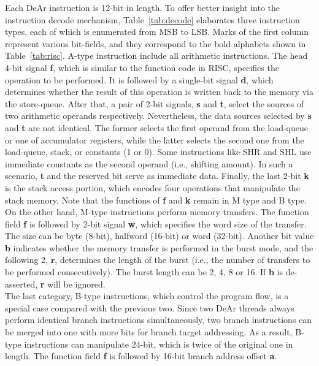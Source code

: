 Each DeAr instruction is 12-bit in length.
To offer better insight into the instruction decode mechanism, 
Table~\ref{tab:decode} elaborates three instruction types, 
each of which is enumerated from MSB to LSB.
Marks of the first column represent various bit-fields, 
and they correspond to the bold alphabets shown in Table~\ref{tab:risc}.
A-type instruction include all arithmetic instructions.
The head 4-bit signal \textbf{f}, which is similar to the function code in RISC, specifies the operation to be performed.
It is followed by a single-bit signal \textbf{d}, which determines whether the result of this operation is written back to the memory via the store-queue.
After that, a pair of 2-bit signals, \textbf{s} and \textbf{t}, select the sources of two arithmetic operands respectively. 
Nevertheless, the data sources selected by \textbf{s} and \textbf{t} are not identical.
The former selects the first operand from the load-queue or one of accumulator registers, 
while the latter selects the second one from the load-queue, stack, or constants (1 or 0).
Some instructions like SHR and SHL use immediate constants as the second operand (i.e., shifting amount).
In such a scenario, \textbf{t} and the reserved bit serve as immediate data.
Finally, the last 2-bit \textbf{k} is the stack access portion, which encodes four operations that manipulate the stack memory.
Note that the functions of \textbf{f} and \textbf{k} remain in M type and B type.
\\\indent On the other hand, M-type instructions perform memory transfers.
The function field \textbf{f} is followed by 2-bit signal \textbf{w}, 
which specifies the word size of the transfer.
The size can be byte (8-bit), halfword (16-bit) or word (32-bit).
Another bit value \textbf{b} indicates whether the memory transfer is performed in the burst mode, 
and the following 2, \textbf{r}, determines the length of the burst (i.e., the number of transfers to be performed consecutively).
The burst length can be 2, 4, 8 or 16.
If \textbf{b} is de-asserted, \textbf{r} will be ignored.
\\\indent The last category, B-type instructions, which control the program flow, 
is a special case compared with the previous two.
Since two DeAr threads always perform identical branch instructions simultaneously, 
two branch instructions can be merged into one with more bits for branch target addressing.
As a result, B-type instructions can manipulate 24-bit, which is twice of the original one in length.
The function field \textbf{f} is followed by 16-bit branch address offset \textbf{a}.

